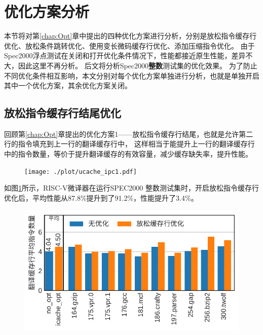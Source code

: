 \section{优化方案分析}

本节将对第\ref{chap:Opt}章中提出的四种优化方案进行分析，分别是放松指令缓存行优化、放松条件跳转优化、使用变长微码缓存行优化、添加压缩指令优化。
由于Spec2000浮点测试在关闭和打开优化条件情况下，性能都接近原生性能，差异不大，因此这里不再分析。
后文将分析Spec2000\textbf{整数}测试集的优化效果。
为了防止不同优化条件相互影响，本文分别对每个优化方案单独进行分析，也就是单独开启其中一个优化方案，其余优化方案关闭。

\subsection{放松指令缓存行结尾优化}

回顾第\ref{chap:Opt}章提出的优化方案1——放松指令缓存行结尾，也就是允许第二行的指令填充到上一行的翻译缓存行中，
这样相当于能提升上一行的翻译缓存行中的指令数量，等价于提升翻译缓存的有效容量，减少缓存缺失率，提升性能。

\begin{figure}[!htbp]
  \centering
  \texttt{[image: ./plot/ucache\_ipc1.pdf]}
  \label{img:ipc1}
\end{figure}

如图\ref{img:ipc1}所示，RISC-V微译器在运行SPEC2000 整数测试集时，开启放松指令缓存行优化后，平均性能从87.8\%提升到了91.2\%，性能提升了3.4\%。

\begin{figure}[!htbp]
  \centering
  \includegraphics[width=0.8\linewidth]{./plot/ucacheline_nums1.pdf}
  \label{img:ucacheline_nums1}
\end{figure}


